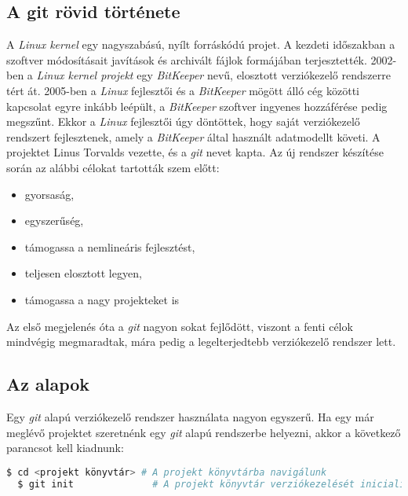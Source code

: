 \subsection{A git rövid története}

A \textit{Linux kernel} egy nagyszabású, nyílt forráskódú projet. A kezdeti
időszakban a szoftver módosításait javítások és archivált fájlok formájában
terjesztették. 2002-ben a \textit{Linux kernel projekt} egy \textit{BitKeeper}
nevű, elosztott verziókezelő rendszerre tért át. 2005-ben a \textit{Linux}
fejlesztői és a \textit{BitKeeper} mögött álló cég közötti kapcsolat egyre
inkább leépült, a \textit{BitKeeper} szoftver ingyenes hozzáférése pedig
megszűnt. Ekkor a \textit{Linux} fejlesztői úgy döntöttek, hogy saját
verziókezelő rendszert fejlesztenek, amely a \textit{BitKeeper} által
használt adatmodellt követi. A projektet Linus Torvalds vezette, és a
\textit{git} nevet kapta. Az új rendszer készítése során az alábbi célokat
tartották szem előtt:
\begin{itemize}
	\item gyorsaság,
	\item egyszerűség,
	\item támogassa a nemlineáris fejlesztést,
	\item teljesen elosztott legyen,
	\item támogassa a nagy projekteket is
\end{itemize}
Az első megjelenés óta a \textit{git} nagyon sokat fejlődött, viszont a fenti
célok mindvégig megmaradtak, mára pedig a legelterjedtebb verziókezelő rendszer
lett. \cite{git_scm_1.2}

\subsection{Az alapok}

Egy \textit{git} alapú verziókezelő rendszer használata nagyon egyszerű.
Ha egy már meglévő projektet szeretnénk egy \textit{git} alapú rendszerbe
helyezni, akkor a következő parancsot kell kiadnunk:

\begin{lstlisting}[caption={A git inicializálása},language=sh]
  $ cd <projekt könyvtár> # A projekt könyvtárba navigálunk
  $ git init              # A projekt könyvtár verziókezelését inicializáljuk
\end{lstlisting}

